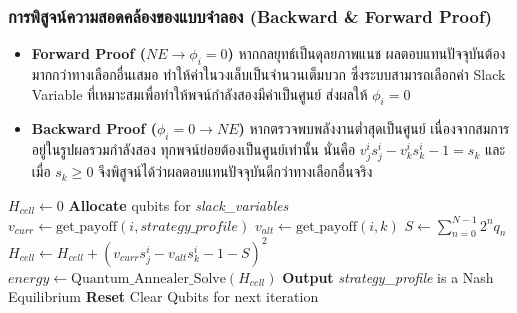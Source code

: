 \subsubsection{การพิสูจน์ความสอดคล้องของแบบจำลอง (Backward \& Forward Proof)}
\begin{itemize}
    \item \textbf{Forward Proof ($NE \rightarrow \phi_i = 0$)} หากกลยุทธ์เป็นดุลยภาพแนช ผลตอบแทนปัจจุบันต้องมากกว่าทางเลือกอื่นเสมอ ทำให้ค่าในวงเล็บเป็นจำนวนเต็มบวก ซึ่งระบบสามารถเลือกค่า Slack Variable ที่เหมาะสมเพื่อทำให้พจน์กำลังสองมีค่าเป็นศูนย์ ส่งผลให้ $\phi_i = 0$
    \item \textbf{Backward Proof ($\phi_i = 0 \rightarrow NE$)} หากตรวจพบพลังงานต่ำสุดเป็นศูนย์ เนื่องจากสมการอยู่ในรูปผลรวมกำลังสอง ทุกพจน์ย่อยต้องเป็นศูนย์เท่านั้น นั่นคือ $v_j^i s_j^i - v_k^i s_k^i - 1 = s_k$ และเมื่อ $s_k \geq 0$ จึงพิสูจน์ได้ว่าผลตอบแทนปัจจุบันดีกว่าทางเลือกอื่นจริง
\end{itemize}

\begin{algorithm}[H]
\caption{Hybrid Nash Verification with Qubit Management}
\begin{algorithmic}[1]
    \STATE $H_{cell} \gets 0$
    \STATE \textbf{Allocate} qubits for \textit{slack\_variables}
        \STATE $v_{curr} \gets \text{get\_payoff}(i, \textit{strategy\_profile})$
                \STATE $v_{alt} \gets \text{get\_payoff}(i, k)$
                \STATE $S \gets \sum_{n=0}^{N-1} 2^n q_n$
                \STATE $H_{cell} \gets H_{cell} + (v_{curr}s_j^i - v_{alt}s_k^i - 1 - S)^2$
            \ENDIF
        \ENDFOR
    \ENDFOR
    \STATE $energy \gets \text{Quantum\_Annealer\_Solve}(H_{cell})$
        \STATE \textbf{Output} \textit{strategy\_profile} is a Nash Equilibrium
    \ENDIF
    \STATE \textbf{Reset} Clear Qubits for next iteration
\ENDFOR
\end{algorithmic}
\end{algorithm}